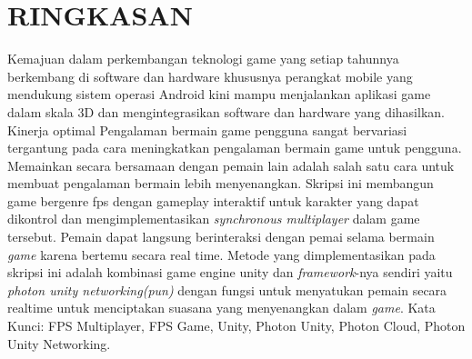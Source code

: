 \chapter*{RINGKASAN}
Kemajuan dalam perkembangan teknologi game yang setiap tahunnya berkembang di 
software dan hardware khususnya  perangkat mobile yang mendukung sistem operasi Android 
kini mampu menjalankan aplikasi game dalam skala 3D dan mengintegrasikan software dan hardware yang dihasilkan. 
Kinerja optimal Pengalaman bermain game pengguna sangat bervariasi tergantung pada cara  meningkatkan pengalaman bermain game untuk pengguna. 
Memainkan secara bersamaan dengan pemain lain adalah salah satu cara untuk membuat pengalaman bermain lebih menyenangkan. 
Skripsi ini membangun game bergenre fps dengan gameplay  interaktif untuk 
karakter yang dapat dikontrol dan mengimplementasikan \textit{synchronous multiplayer} dalam game tersebut. 
Pemain dapat langsung berinteraksi dengan 
pemai selama bermain \textit{game} karena bertemu secara real time. 
Metode yang dimplementasikan pada skripsi ini adalah kombinasi game engine unity dan \textit{framework}-nya sendiri yaitu \textit{photon unity networking(pun)}
dengan fungsi untuk menyatukan pemain secara realtime untuk menciptakan suasana yang menyenangkan dalam \textit{game}.
\newline \break
\noindent Kata Kunci: FPS Multiplayer, FPS Game, Unity, Photon Unity, Photon Cloud, Photon Unity Networking.